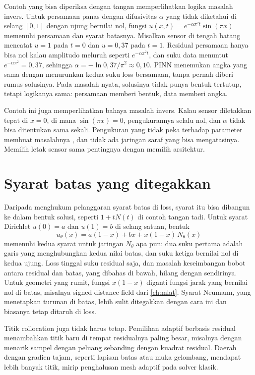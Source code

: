 Contoh yang bisa diperiksa dengan tangan memperlihatkan logika masalah invers. Untuk persamaan panas dengan difusivitas
$\alpha$ yang tidak diketahui di selang $[0,1]$ dengan ujung bernilai nol, fungsi $u(x,t)=e^{-\alpha\pi^2t}\sin(\pi x)$
memenuhi persamaan dan syarat batasnya. Misalkan sensor di tengah batang mencatat $u=1$ pada $t=0$ dan $u=0{,}37$ pada $t=1$.
Residual persamaan hanya bisa nol kalau amplitudo meluruh seperti $e^{-\alpha\pi^2t}$, dan suku data menuntut $e^{-\alpha\pi^2}=0{,}37$,
sehingga $\alpha=-\ln0{,}37/\pi^2\approx0{,}10$. PINN menemukan angka yang sama dengan menurunkan kedua suku loss bersamaan,
tanpa pernah diberi rumus solusinya. Pada masalah nyata, solusinya tidak punya bentuk tertutup, tetapi logikanya sama:
persamaan memberi bentuk, data memberi angka.

Contoh ini juga memperlihatkan bahaya masalah invers. Kalau sensor diletakkan tepat di $x=0$, di mana $\sin(\pi x)=0$,
pengukurannya selalu nol, dan $\alpha$ tidak bisa ditentukan sama sekali. Pengukuran yang tidak peka terhadap parameter
membuat masalahnya , dan tidak ada jaringan saraf yang bisa mengatasinya. Memilih letak sensor sama
pentingnya dengan memilih arsitektur.

\section{Syarat batas yang ditegakkan}

Daripada menghukum pelanggaran syarat batas di loss, syarat itu bisa dibangun ke dalam bentuk solusi, seperti $1+tN(t)$ di
contoh tangan tadi. Untuk syarat Dirichlet $u(0)=a$ dan $u(1)=b$ di selang satuan, bentuk
\begin{equation}
u_\theta(x)=a(1-x)+bx+x(1-x)\,N_\theta(x)
\end{equation}
memenuhi kedua syarat untuk jaringan $N_\theta$ apa pun: dua suku pertama adalah garis yang menghubungkan kedua nilai batas,
dan suku ketiga bernilai nol di kedua ujung. Loss tinggal suku residual saja, dan masalah keseimbangan bobot antara residual
dan batas, yang dibahas di bawah, hilang dengan sendirinya. Untuk geometri yang rumit, fungsi $x(1-x)$ diganti fungsi jarak
yang bernilai nol di batas, misalnya signed distance field dari \cref{ch:mlat}. Syarat Neumann, yang menetapkan turunan di
batas, lebih sulit ditegakkan dengan cara ini dan biasanya tetap ditaruh di loss.

Titik collocation juga tidak harus tetap. Pemilihan adaptif berbasis residual menambahkan titik baru di tempat residualnya
paling besar, misalnya dengan menarik sampel dengan peluang sebanding dengan kuadrat residual. Daerah dengan gradien tajam,
seperti lapisan batas atau muka gelombang, mendapat lebih banyak titik, mirip penghalusan mesh adaptif pada solver klasik.

